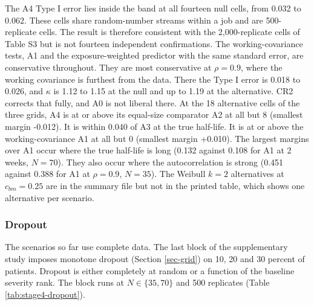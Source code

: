 \documentclass[
  11pt,
]{article}
\begin{document}
The A4 Type I error lies inside the band at all fourteen null cells,
from 0.032 to
0.062.
These cells share random-number streams within a job and are
500-replicate cells. The result is therefore consistent with the
2,000-replicate cells of Table S3 but is not fourteen independent
confirmations. The working-covariance tests, A1 and the
exposure-weighted predictor with the same standard error, are
conservative throughout. They are most conservative at \(\rho = 0.9\),
where the working covariance is furthest from the data. There the
Type I error is 0.018 to 0.026, and \(\kappa\) is
1.12 to 1.15 at the null and up to
1.19 at the alternative. CR2
corrects that fully, and A0 is not liberal there. At the
18 alternative cells of the three grids, A4 is at or
above its equal-size comparator A2 at all but
8 (smallest margin
-0.012). It is within
0.040 of A3 at the true
half-life. It is at or above the working-covariance A1 at all but
0 (smallest margin
+0.010). The largest margins over A1
occur where the true half-life is long
(0.132
against 0.108
for A1 at 2 weeks, \(N = 70\)). They also occur where the
autocorrelation is strong
(0.451
against 0.388
for A1 at \(\rho = 0.9\), \(N = 35\)). The Weibull \(k = 2\) alternatives
at \(c_{bm} = 0.25\) are in the summary file but not in the printed
table, which shows one alternative per scenario.

\subsubsection{Dropout}\label{sec-dropout}

The scenarios so far use complete data. The last block of the
supplementary study imposes monotone dropout (Section
\ref{sec-grid}) on 10, 20 and 30 percent of patients. Dropout is
either completely at random or a function of the baseline severity
rank. The block runs at \(N
\in \{35, 70\}\) and 500 replicates (Table
\ref{tab:stage4-dropout}).
\end{document}
